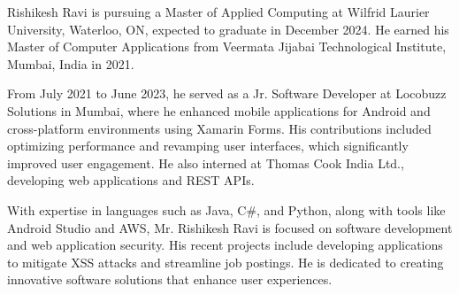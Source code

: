 \documentclass{ieeeaccess}
\begin{document}
%
%
%
%
%
%

\begin{IEEEbiography}{Rishikesh Ravi} is pursuing a Master of Applied Computing at Wilfrid Laurier University, Waterloo, ON, expected to graduate in December 2024. He earned his Master of Computer Applications from Veermata Jijabai Technological Institute, Mumbai, India in 2021.
	
	From July 2021 to June 2023, he served as a Jr. Software Developer at Locobuzz Solutions in Mumbai, where he enhanced mobile applications for Android and cross-platform environments using Xamarin Forms. His contributions included optimizing performance and revamping user interfaces, which significantly improved user engagement. He also interned at Thomas Cook India Ltd., developing web applications and REST APIs.
	
	With expertise in languages such as Java, C\#, and Python, along with tools like Android Studio and AWS, Mr. Rishikesh Ravi is focused on software development and web application security. His recent projects include developing applications to mitigate XSS attacks and streamline job postings. He is dedicated to creating innovative software solutions that enhance user experiences.
\end{IEEEbiography}
\end{document}
